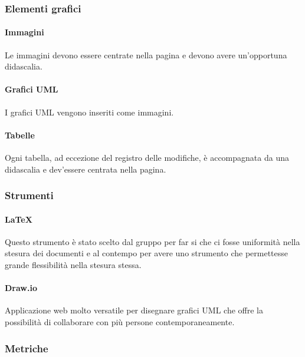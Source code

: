 \subsubsection{Elementi grafici}
\label{ssub:elementi_grafici}

\paragraph{Immagini}
\label{par:immagini}

Le immagini devono essere centrate nella pagina e devono avere un'opportuna didascalia.

\paragraph{Grafici UML}
\label{par:uml}

I grafici UML vengono inseriti come immagini.

\paragraph{Tabelle}
\label{par:tabelle}

Ogni tabella, ad eccezione del registro delle modifiche, è accompagnata da una didascalia e dev'essere centrata nella 
pagina.

\subsubsection{Strumenti}
\label{ssub:strumenti}

\paragraph{\LaTeX}
\label{par:latex}

Questo strumento è stato scelto dal gruppo per far si che ci fosse uniformità nella stesura dei documenti e al contempo 
per avere uno strumento che permettesse grande flessibilità nella stesura stessa.

\paragraph{Draw.io}
\label{par:drawio}

Applicazione web molto versatile per disegnare grafici UML che offre la possibilità di collaborare con più persone 
contemporaneamente.

\subsubsection{Metriche}
\label{ssub:metriche}

